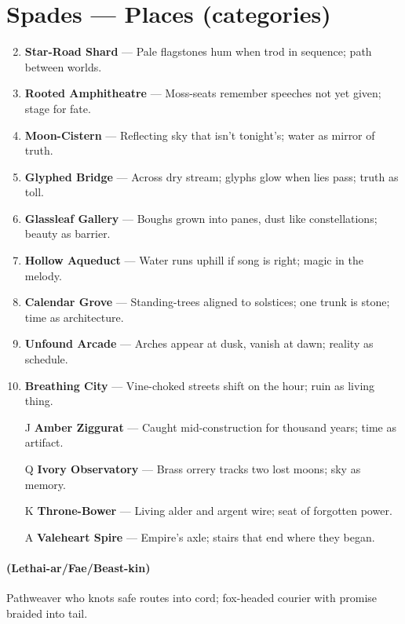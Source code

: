 \section*{Spades --- Places (categories)}
\label{sec:valewood-places}
\begin{enumerate}
\setcounter{enumi}{1}
\item \textbf{Star-Road Shard} --- Pale flagstones hum when trod in sequence; path between worlds.
\item \textbf{Rooted Amphitheatre} --- Moss-seats remember speeches not yet given; stage for fate.
\item \textbf{Moon-Cistern} --- Reflecting sky that isn't tonight's; water as mirror of truth.
\item \textbf{Glyphed Bridge} --- Across dry stream; glyphs glow when lies pass; truth as toll.
\item \textbf{Glassleaf Gallery} --- Boughs grown into panes, dust like constellations; beauty as barrier.
\item \textbf{Hollow Aqueduct} --- Water runs uphill if song is right; magic in the melody.
\item \textbf{Calendar Grove} --- Standing-trees aligned to solstices; one trunk is stone; time as architecture.
\item \textbf{Unfound Arcade} --- Arches appear at dusk, vanish at dawn; reality as schedule.
\item \textbf{Breathing City} --- Vine-choked streets shift on the hour; ruin as living thing.
\item[J] \textbf{Amber Ziggurat} --- Caught mid-construction for thousand years; time as artifact.
\item[Q] \textbf{Ivory Observatory} --- Brass orrery tracks two lost moons; sky as memory.
\item[K] \textbf{Throne-Bower} --- Living alder and argent wire; seat of forgotten power.
\item[A] \textbf{Valeheart Spire} --- Empire's axle; stairs that end where they began.
\end{enumerate}

\paragraph*{(Lethai-ar/Fae/Beast-kin)} Pathweaver who knots safe routes into cord; fox-headed courier with promise braided into tail.

